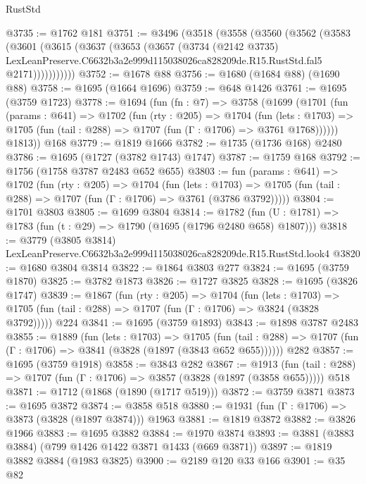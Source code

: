 \begin{lexlean}{RustStd}
\begin{coremodule}
@3735 := @1762 @181
@3751 := @3496
    (@3518
      (@3558
        (@3560
          (@3562
            (@3583
              (@3601
                (@3615
                  (@3637
                    (@3653
                      (@3657
                        (@3734
                          (@2142 @3735)
                          LexLeanPreserve.C6632b3a2e999d115038026ca828209de.R15.RustStd.fal5
                          @2171)))))))))))
@3752 := @1678 @88
@3756 := @1680 (@1684 @88) (@1690 @88)
@3758 := @1695 (@1664 @1696)
@3759 := @648 @1426
@3761 := @1695 (@3759 @1723)
@3778 := @1694
    (fun (fn : @7) =>
    @3758
      (@1699
        (@1701
          (fun (params : @641) =>
          @1702
            (fun (rty : @205) =>
            @1704
              (fun (lets : @1703) =>
              @1705 (fun (tail : @288) => @1707 (fun (Γ : @1706) => @3761 @1768))))))
        @1813))
    @168
@3779 := @1819 @1666
@3782 := @1735 (@1736 @168) @2480
@3786 := @1695 (@1727 (@3782 @1743) @1747)
@3787 := @1759 @168
@3792 := @1756 (@1758 @3787 @2483 @652 @655)
@3803 := fun (params : @641) =>
  @1702
    (fun (rty : @205) =>
    @1704
      (fun (lets : @1703) =>
      @1705 (fun (tail : @288) => @1707 (fun (Γ : @1706) => @3761 (@3786 @3792)))))
@3804 := @1701 @3803
@3805 := @1699 @3804
@3814 := @1782 (fun (U : @1781) => @1783 (fun (t : @29) => @1790 (@1695 (@1796 @2480 @658) @1807)))
@3818 := @3779 (@3805 @3814) LexLeanPreserve.C6632b3a2e999d115038026ca828209de.R15.RustStd.look4
@3820 := @1680 @3804 @3814
@3822 := @1864 @3803 @277
@3824 := @1695 (@3759 @1870)
@3825 := @3782 @1873
@3826 := @1727 @3825
@3828 := @1695 (@3826 @1747)
@3839 := @1867
    (fun (rty : @205) =>
    @1704
      (fun (lets : @1703) =>
      @1705 (fun (tail : @288) => @1707 (fun (Γ : @1706) => @3824 (@3828 @3792)))))
    @224
@3841 := @1695 (@3759 @1893)
@3843 := @1898 @3787 @2483
@3855 := @1889
    (fun (lets : @1703) =>
    @1705 (fun (tail : @288) => @1707 (fun (Γ : @1706) => @3841 (@3828 (@1897 (@3843 @652 @655))))))
    @282
@3857 := @1695 (@3759 @1918)
@3858 := @3843 @282
@3867 := @1913
    (fun (tail : @288) => @1707 (fun (Γ : @1706) => @3857 (@3828 (@1897 (@3858 @655)))))
    @518
@3871 := @1712 (@1868 (@1890 (@1717 @519)))
@3872 := @3759 @3871
@3873 := @1695 @3872
@3874 := @3858 @518
@3880 := @1931 (fun (Γ : @1706) => @3873 (@3828 (@1897 @3874))) @1963
@3881 := @1819 @3872
@3882 := @3826 @1966
@3883 := @1695 @3882
@3884 := @1970 @3874
@3893 := @3881 (@3883 @3884) (@799 @1426 @1422 @3871 @1433 (@669 @3871))
@3897 := @1819 @3882 @3884 (@1983 @3825)
@3900 := @2189 @120 @33 @166
@3901 := @35 @82

\end{coremodule}
\end{lexlean}
